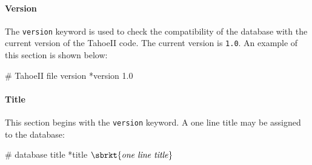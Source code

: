 \paragraph{Version}
The \texttt{version} keyword is used to check the compatibility of the 
database with the current version of the TahoeII code. 
The current version is \texttt{1.0}.
An example of 
this section is shown below:
\begin{inputfile}
# TahoeII file version
*version 1.0
\end{inputfile}

\paragraph{Title}
This section begins with the \texttt{version} keyword.
A one line title may be assigned to the database:
\begin{inputfile}
# database title
*title
\(\sbrkt{\textrm{\textit{one line title}}}\)
\end{inputfile}

